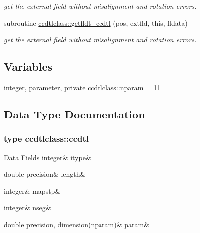\begin{DoxyCompactItemize}
\begin{DoxyCompactList}\small\item\em get the external field without misalignment and rotation errors. \end{DoxyCompactList}\item 
subroutine \mbox{\hyperlink{namespaceccdtlclass_aa1b97607af3b788522be9e22c479ce2a}{ccdtlclass\+::getfldt\+\_\+ccdtl}} (pos, extfld, this, fldata)
\begin{DoxyCompactList}\small\item\em get the external field without misalignment and rotation errors. \end{DoxyCompactList}\end{DoxyCompactItemize}
\subsection*{Variables}
\begin{DoxyCompactItemize}
\item 
integer, parameter, private \mbox{\hyperlink{namespaceccdtlclass_a0e8e95c86f2dab6639fc79f05859b6ea}{ccdtlclass\+::nparam}} = 11
\end{DoxyCompactItemize}


\subsection{Data Type Documentation}
\label{structccdtlclass_1_1ccdtl}
\subsubsection{type ccdtlclass\+::ccdtl}
\begin{DoxyFields}{Data Fields}
\mbox{\label{namespaceccdtlclass_aea542f9975283b5fd43c8f15a0d2762f}} 
integer&
itype&
\\
\hline

\mbox{\label{namespaceccdtlclass_a367acb3cd3326d78cf47fe5c8891b80c}} 
double precision&
length&
\\
\hline

\mbox{\label{namespaceccdtlclass_a646c337f17e8c188638d58449ea92b99}} 
integer&
mapstp&
\\
\hline

\mbox{\label{namespaceccdtlclass_a56759205b010998a69c2716e35e0d6d6}} 
integer&
nseg&
\\
\hline

\mbox{\label{namespaceccdtlclass_a6b125e6ca6440736ab2272ad373cc24d}} 
double precision, dimension(\mbox{\hyperlink{namespaceccdtlclass_a0e8e95c86f2dab6639fc79f05859b6ea}{nparam}})&
param&
\\
\hline

\end{DoxyFields}
